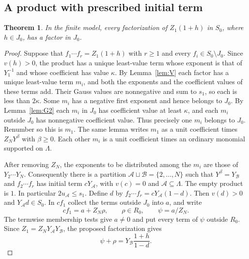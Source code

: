 \documentclass[11pt, letterpaper]{article}
\newtheorem{theorem}{Theorem}[section]
\theoremstyle{definition}
\theoremstyle{remark}
\begin{document}
\subsection{A product with prescribed initial term}

\begin{theorem}
    \label{thm:F}
    In the finite model, every factorization of $Z_{1}(1 + h)$ in $S_{0}$, where $h \in J_{0}$, has a factor in $J_{0}$.
\end{theorem}

\begin{proof}
    Suppose that $f_{1} \cdots f_{r} = Z_{1}(1 + h)$ with $r \ge 1$ and every $f_{i} \in S_{0} \setminus J_{0}$.
    Since $v(h) > 0$, the product has a unique least-value term whose exponent is that of $Y_{1}^{-1}$ and whose coefficient has value $\kappa$.
    By Lemma~\ref{lem:V} each factor has a unique least-value term $m_{i}$, and both the exponents and the coefficient values of these terms add.
    Their Gauss values are nonnegative and sum to $s_{1}$, so each is less than $2\kappa$.
    Some $m_{i}$ has a negative first exponent and hence belongs to $J_{0}$.
    By Lemma~\ref{lem:G2} each $m_{i}$ in $J_{0}$ has coefficient value at least $\kappa$, and each $m_{i}$ outside $J_{0}$ has nonnegative coefficient value.
    Thus precisely one $m_{i}$ belongs to $J_{0}$.
    Renumber so this is $m_{1}$.
    The same lemma writes $m_{1}$ as a unit coefficient times $Z_{N}Y^{\beta}$ with $\beta \ge 0$.
    Each other $m_{i}$ is a unit coefficient times an ordinary monomial supported on $\Lambda$.

    After removing $Z_{N}$, the exponents to be distributed among the $m_{i}$ are those of $Y_{2} \cdots Y_{N}$.
    Consequently there is a partition $\mathcal{A} \sqcup \mathcal{B} = \{2, \dots, N\}$ such that $Y^{\beta} = Y_{\mathcal{B}}$ and $f_{2} \cdots f_{r}$ has initial term $cY_{\mathcal{A}}$, with $v(c) = 0$ and $\mathcal{A} \subseteq \Lambda$.
    The empty product is $1$.
    In particular $2u_{\mathcal{A}} \le s_{1}$.
    Define $d$ by $f_{2} \cdots f_{r} = cY_{\mathcal{A}}(1 - d)$.
    Then $v(d) > 0$ and $Y_{\mathcal{A}}d \in S_{0}$.
    In $cf_{1}$ collect the terms outside $J_{0}$ into $a$, and write
    \[
        cf_{1} = a + Z_{N}\rho,\qquad \rho \in R_{0},\qquad \psi = a/Z_{N}.
    \]
    The termwise membership tests give $a \ne 0$ and put every term of $\psi$ outside $R_{0}$.
    Since $Z_{1} = Z_{N}Y_{\mathcal{A}}Y_{\mathcal{B}}$, the proposed factorization gives
    \[
        \psi + \rho = Y_{\mathcal{B}}\frac{1 + h}{1 - d}.
    \]


\end{proof}
\end{document}
